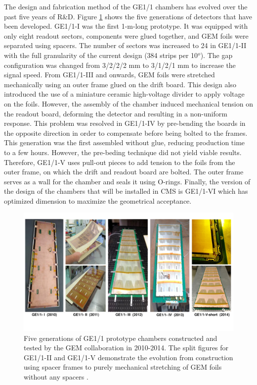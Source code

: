     The design and fabrication method of the GE1/1 chambers has evolved over the past five years of R\&D. Figure \ref{fig:II-1-generations} shows the five generations of detectors that have been developed. GE1/1-I was the first 1-m-long prototype. It was equipped with only eight readout sectors, components were glued together, and GEM foils were separated using spacers. The number of sectors was increased to 24 in GE1/1-II with the full granularity of the current design (384 strips per 10$^o$). The gap configuration was changed from 3/2/2/2 mm to 3/1/2/1 mm to increase the signal speed. From GE1/1-III and onwards, GEM foils were stretched mechanically using an outer frame glued on the drift board. This design also introduced the use of a miniature ceramic high-voltage divider to apply voltage on the foils. However, the assembly of the chamber induced mechanical tension on the readout board, deforming the detector and resulting in a non-uniform response. This problem was resolved in GE1/1-IV by pre-bending the boards in the opposite direction in order to compensate before being bolted to the frames. This generation was the first assembled without glue, reducing production time to a few hours. However, the pre-beding technique did not yield viable results. Therefore, GE1/1-V uses pull-out pieces to add tension to the foils from the outer frame, on which the drift and readout board are bolted. The outer frame serves as a wall for the chamber and seals it using O-rings. Finally, the version of the design of the chambers that will be installed in CMS is GE1/1-VI which has optimized dimension to maximize the geometrical acceptance.

    \begin{figure}[t!]
      \centering
      \includegraphics[width=\textwidth]{img/II-1-gem/generations.pdf}
      \caption{Five generations of GE1/1 prototype chambers constructed and tested by the GEM collaboration in 2010-2014. The split figures for GE1/1-II and GE1/1-V demonstrate the evolution from construction using spacer frames to purely mechanical stretching of GEM foils without any spacers \cite{Colaleo:2021453}.}
      \label{fig:II-1-generations}
    \end{figure}

